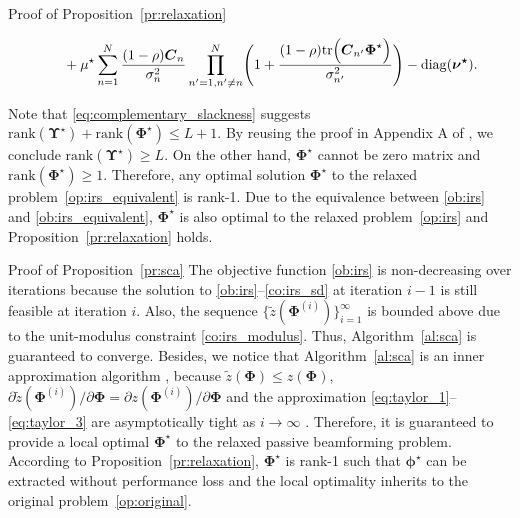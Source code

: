 \documentclass[journal]{IEEEtran}
\begin{document}
\begin{appendix}
\begin{subsection}{Proof of Proposition~\ref{pr:relaxation}}
\begin{figure*}[!b]
\begin{align}
					& \quad + \mu^\star \sum_{n=1}^N \frac{(1-\rho) \boldsymbol{C}_n}{\sigma_n^2} \prod_{n'=1,n' \ne n}^N \Biggl(
						1 + \frac{(1-\rho)\mathrm{tr}\Bigl(
							\boldsymbol{C}_{n'} \boldsymbol{\Phi}^\star
						\Bigr)}{\sigma_{n'}^2}
					\Biggr) - \mathrm{diag}(\boldsymbol{\nu^\star}).
				\end{align}
			\end{figure*}
			Note that \eqref{eq:complementary_slackness} suggests $\mathrm{rank}(\boldsymbol{\Upsilon}^\star)+\mathrm{rank}(\boldsymbol{\Phi}^\star) \le L+1$. By reusing the proof in Appendix A of \cite{Xu2020}, we conclude $\mathrm{rank}(\boldsymbol{\Upsilon}^\star) \ge L$. On the other hand, $\boldsymbol{\Phi}^\star$ cannot be zero matrix and $\mathrm{rank}(\boldsymbol{\Phi}^\star) \ge 1$. Therefore, any optimal solution $\boldsymbol{\Phi}^\star$ to the relaxed problem~\eqref{op:irs_equivalent} is rank-\num{1}. Due to the equivalence between \eqref{ob:irs} and \eqref{ob:irs_equivalent}, $\boldsymbol{\Phi}^\star$ is also optimal to the relaxed problem~\eqref{op:irs} and Proposition~\ref{pr:relaxation} holds.
		\end{subsection}

		\begin{subsection}{Proof of Proposition~\ref{pr:sca}}\label{ap:sca}
			The objective function \eqref{ob:irs} is non-decreasing over iterations because the solution to \eqref{ob:irs}--\eqref{co:irs_sd} at iteration $i-1$ is still feasible at iteration $i$. Also, the sequence $\{\tilde{z}(\boldsymbol{\Phi}^{(i)})\}_{i=1}^{\infty}$ is bounded above due to the unit-modulus constraint \eqref{co:irs_modulus}. Thus, Algorithm~\ref{al:sca} is guaranteed to converge. Besides, we notice that Algorithm~\ref{al:sca} is an inner approximation algorithm \cite{Marks1978}, because $\tilde{z}(\boldsymbol{\Phi}) \le z(\boldsymbol{\Phi})$, $\partial\tilde{z}(\boldsymbol{\Phi}^{(i)})/\partial\boldsymbol{\Phi}=\partial z(\boldsymbol{\Phi}^{(i)})/\partial\boldsymbol{\Phi}$ and the approximation \eqref{eq:taylor_1}--\eqref{eq:taylor_3} are asymptotically tight as $i \to \infty$ \cite{Li2013}. Therefore, it is guaranteed to provide a local optimal $\boldsymbol{\Phi}^{\star}$ to the relaxed passive beamforming problem. According to Proposition~\ref{pr:relaxation}, $\boldsymbol{\Phi}^{\star}$ is rank-\num{1} such that $\boldsymbol{\phi}^{\star}$ can be extracted without performance loss and the local optimality inherits to the original problem~\eqref{op:original}.
		\end{subsection}


\end{appendix}
\end{document}
